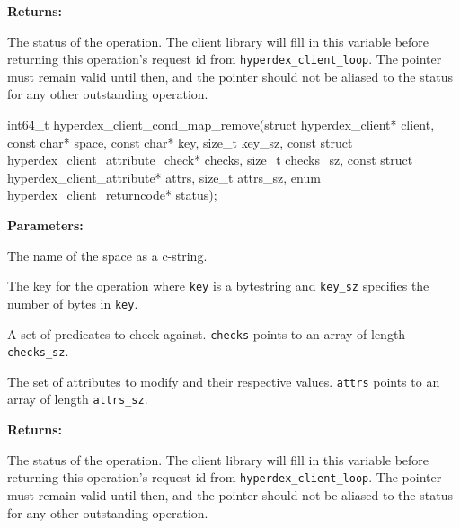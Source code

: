 \noindent\textbf{Returns:}
\begin{description}[labelindent=\widthof{{\texttt{status}}},leftmargin=*,noitemsep,nolistsep,align=right]
\item[\texttt{status}] The status of the operation.  The client library will fill in this variable before returning this operation's request id from \texttt{hyperdex\_client\_loop}.  The pointer must remain valid until then, and the pointer should not be aliased to the status for any other outstanding operation.
\end{description}

\funcsep
{}
\begin{ccode}
int64_t hyperdex_client_cond_map_remove(struct hyperdex_client* client,
                const char* space,
                const char* key, size_t key_sz,
                const struct hyperdex_client_attribute_check* checks, size_t checks_sz,
                const struct hyperdex_client_attribute* attrs, size_t attrs_sz,
                enum hyperdex_client_returncode* status);
\end{ccode}
\funcdesc 

\noindent\textbf{Parameters:}
\begin{description}[labelindent=\widthof{{\texttt{checks}, \texttt{checks\_sz}}},leftmargin=*,noitemsep,nolistsep,align=right]
\item[\texttt{space}] The name of the space as a c-string.
\item[\texttt{key}, \texttt{key\_sz}] The key for the operation where \texttt{key} is a bytestring and \texttt{key\_sz} specifies the number of bytes in \texttt{key}.
\item[\texttt{checks}, \texttt{checks\_sz}] A set of predicates to check against.  \texttt{checks} points to an array of length \texttt{checks\_sz}.
\item[\texttt{attrs}, \texttt{attrs\_sz}] The set of attributes to modify and their respective values.  \texttt{attrs} points to an array of length \texttt{attrs\_sz}.
\end{description}

\noindent\textbf{Returns:}
\begin{description}[labelindent=\widthof{{\texttt{status}}},leftmargin=*,noitemsep,nolistsep,align=right]
\item[\texttt{status}] The status of the operation.  The client library will fill in this variable before returning this operation's request id from \texttt{hyperdex\_client\_loop}.  The pointer must remain valid until then, and the pointer should not be aliased to the status for any other outstanding operation.
\end{description}

